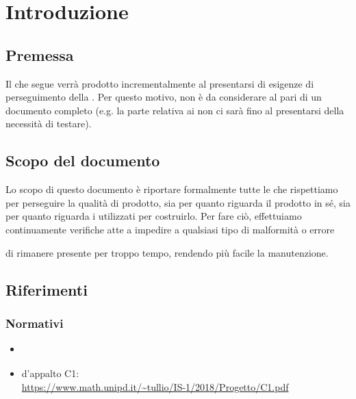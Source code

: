 \section{Introduzione}\label{introduzione}

    

	
	

    \subsection{Premessa}
    Il  che segue verrà prodotto incrementalmente al presentarsi di esigenze di perseguimento della .
    Per questo motivo, non è da considerare al pari di un documento completo (e.g. la parte relativa ai non ci sarà fino
    al presentarsi della necessità di testare).

    \subsection{Scopo del documento}
    Lo scopo di questo documento è riportare formalmente tutte le  che rispettiamo per perseguire
    la qualità di prodotto, sia per quanto riguarda il prodotto in s\'e, sia per quanto riguarda i 
    utilizzati per costruirlo. Per fare ciò, effettuiamo continuamente verifiche atte a impedire a qualsiasi tipo di malformità o errore

    di rimanere presente per troppo tempo, rendendo più facile la manutenzione.

    

    \subsection{Riferimenti}
	
	\subsubsection{Normativi}
    \begin{itemize}
    	\item \textit{\NdPv}
    	\item {} d'appalto C1:\\ \url{https://www.math.unipd.it/~tullio/IS-1/2018/Progetto/C1.pdf}
    \end{itemize}
    
